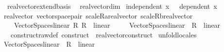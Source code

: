 \begin{isabellebody}
\ \ real{\isacharunderscore}{\kern0pt}vector{\isachardot}{\kern0pt}extend{\isacharunderscore}{\kern0pt}basis\isanewline
\ \ real{\isacharunderscore}{\kern0pt}vector{\isachardot}{\kern0pt}dim\isanewline
\isanewline
{}\isamarkupfalse%
\ {\isachardoublequoteopen}independent\ x\ {\isasymequiv}\ {\isasymnot}\ dependent\ x{\isachardoublequoteclose}\isanewline
\isanewline
{}\isamarkupfalse%
\ real{\isacharunderscore}{\kern0pt}vector{\isacharquery}{\kern0pt}{\isacharcolon}{\kern0pt}\ vector{\isacharunderscore}{\kern0pt}space{\isacharunderscore}{\kern0pt}pair\ {\isachardoublequoteopen}scaleR{\isacharcolon}{\kern0pt}{\isacharcolon}{\kern0pt}{\isacharunderscore}{\kern0pt}{\isasymRightarrow}{\isacharunderscore}{\kern0pt}{\isasymRightarrow}{\isacharprime}{\kern0pt}a{\isacharcolon}{\kern0pt}{\isacharcolon}{\kern0pt}real{\isacharunderscore}{\kern0pt}vector{\isachardoublequoteclose}\ {\isachardoublequoteopen}scaleR{\isacharcolon}{\kern0pt}{\isacharcolon}{\kern0pt}{\isacharunderscore}{\kern0pt}{\isasymRightarrow}{\isacharunderscore}{\kern0pt}{\isasymRightarrow}{\isacharprime}{\kern0pt}b{\isacharcolon}{\kern0pt}{\isacharcolon}{\kern0pt}real{\isacharunderscore}{\kern0pt}vector{\isachardoublequoteclose}\isanewline
\ \ \ \ {\isachardoublequoteopen}Vector{\isacharunderscore}{\kern0pt}Spaces{\isachardot}{\kern0pt}linear\ {\isacharparenleft}{\kern0pt}{\isacharasterisk}{\kern0pt}\isactrlsub R{\isacharparenright}{\kern0pt}\ {\isacharparenleft}{\kern0pt}{\isacharasterisk}{\kern0pt}\isactrlsub R{\isacharparenright}{\kern0pt}\ {\isacharequal}{\kern0pt}\ linear{\isachardoublequoteclose}\isanewline
\ \ \ \ \ {\isachardoublequoteopen}Vector{\isacharunderscore}{\kern0pt}Spaces{\isachardot}{\kern0pt}linear\ {\isacharparenleft}{\kern0pt}{\isacharasterisk}{\kern0pt}{\isacharparenright}{\kern0pt}\ {\isacharparenleft}{\kern0pt}{\isacharasterisk}{\kern0pt}\isactrlsub R{\isacharparenright}{\kern0pt}\ {\isacharequal}{\kern0pt}\ linear{\isachardoublequoteclose}\isanewline
\ \ \ construct{\isacharunderscore}{\kern0pt}raw{\isacharunderscore}{\kern0pt}def{\isacharcolon}{\kern0pt}\ construct\ {\isacharequal}{\kern0pt}\ real{\isacharunderscore}{\kern0pt}vector{\isachardot}{\kern0pt}construct\isanewline
%
\isadelimproof
%
\endisadelimproof
%
\isatagproof
{}\isamarkupfalse%
\ unfold{\isacharunderscore}{\kern0pt}locales\isanewline
\ \ \isamarkupfalse%
\ {\isachardoublequoteopen}Vector{\isacharunderscore}{\kern0pt}Spaces{\isachardot}{\kern0pt}linear\ {\isacharparenleft}{\kern0pt}{\isacharasterisk}{\kern0pt}{\isacharparenright}{\kern0pt}\ {\isacharparenleft}{\kern0pt}{\isacharasterisk}{\kern0pt}\isactrlsub R{\isacharparenright}{\kern0pt}\ {\isacharequal}{\kern0pt}\ linear{\isachardoublequoteclose}\isanewline

\end{isabellebody}
